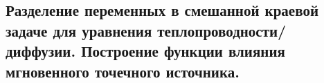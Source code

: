 \subsection{Разделение переменных в смешанной краевой задаче для уравнения теплопроводности/диффузии. Построение функции влияния мгновенного точечного источника.}
